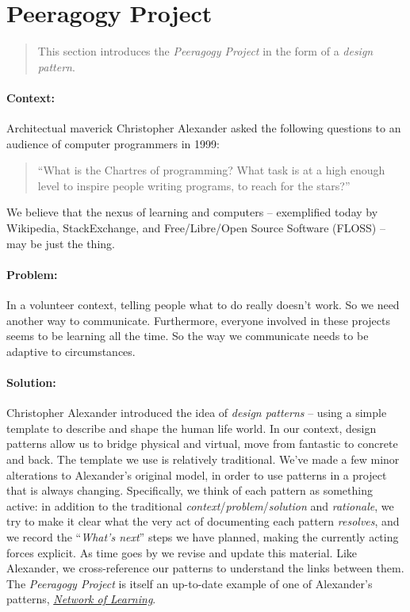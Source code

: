 \section{Peeragogy Project}

\begin{quote}
This section introduces the \emph{Peeragogy Project} in the form of a \emph{design pattern}.
\end{quote}

\paragraph{Context:}  Architectual maverick Christopher Alexander asked the following questions to an audience of computer programmers in 1999: 
\begin{quote}
``What is the Chartres of programming? What task is at a high enough level to inspire people writing programs, to reach for the stars?''
\end{quote}
We believe that the nexus of learning and computers -- exemplified today by Wikipedia, StackExchange, and Free/Libre/Open Source Software (FLOSS) -- may be just the thing.

\paragraph{Problem:} In a volunteer context, telling people what to do really doesn't work.  So we need another way to communicate.  Furthermore, everyone involved in these projects seems to be learning all the time.  So the way we communicate needs to be adaptive to circumstances.

\paragraph{Solution:} Christopher Alexander introduced the idea of \emph{design patterns} -- using a simple template to describe and shape the human life world.  In our context, design patterns allow us to bridge physical and virtual, move from fantastic to concrete and back.  The template we use is relatively traditional.  We've made a few minor alterations to Alexander's original model, in order to use patterns in a project that is always changing.  Specifically, we think of each pattern as something active: in addition to the traditional \emph{context}/\emph{problem}/\emph{solution} and \emph{rationale}, we try to make it clear what the very act of documenting each pattern \emph{resolves}, and we record the ``\emph{What's next}'' steps we have planned, making the currently acting forces explicit.  As time goes by we revise and update this material.  Like Alexander, we cross-reference our patterns to understand the links between them.  The \emph{Peeragogy Project} is itself an up-to-date example of one of Alexander's patterns, \href{http://en.wikipedia.org/wiki/Networked_learning#1970s}{\emph{Network of Learning}}.

